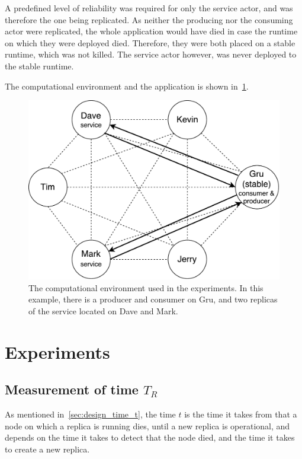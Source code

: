 \documentclass{cslthse-msc}
\begin{document}
A predefined level of reliability was required for only the service actor, and was therefore the one being replicated. As neither the producing nor the consuming actor were replicated, the whole application would have died in case the runtime on which they were deployed died. Therefore, they were both placed on a stable runtime, which was not killed. The service actor however, was never deployed to the stable runtime.

The computational environment and the application is shown in~\cref{fig:evaluation_application}.

\begin{figure}[!hbt]
\centering
\includegraphics[scale=0.5]{images/evaluation_application.pdf} 
\caption{The computational environment used in the experiments. In this example, there is a producer and consumer on Gru, and two replicas of the service located on Dave and Mark.} \label{fig:evaluation_application}
\end{figure}


\section{Experiments}

\subsection{Measurement of time $T_R$} \label{sec:eval_time_t}
As mentioned in~\cref{sec:design_time_t}, the time $t$ is the time it takes from that a node on which a replica is running dies, until a new replica is operational, and depends on the time it takes to detect that the node died, and the time it takes to create a new replica. 
\end{document}
